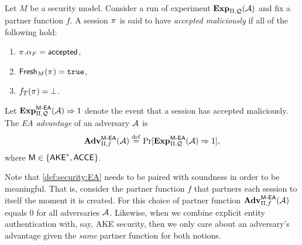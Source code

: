 \begin{definition}\label{def:security:EA}
Let $M$ be a security model.
Consider a run of experiment $\mathbf{Exp}_{\mathrm{\Pi},\mathcal{Q}}^{}(\mathcal{A})$ and fix a partner function $f$. 
A session $\oracle$ is said to have \emph{accepted maliciously} if all of the following hold:
\begin{enumerate}
	\item $\oracle.\runstate_F = \accepted$,
	
	\item $\fresh_{M}(\oracle) = \TRUE$,
	
	\item $f_T(\oracle) = \bot$.
\end{enumerate}
Let $\mathbf{Exp}_{\mathrm{\Pi},\mathcal{Q}}^{\operatorname{\mathsf{M-EA}}}(\mathcal{A}) \Rightarrow 1$ denote the event that a session has accepted maliciously. 
The \emph{EA advantage} of an adversary $\mathcal{A}$ is
\begin{equation}
\mathbf{Adv}_{\mathrm{\Pi},f}^{\operatorname{\mathsf{M-EA}}}(\mathcal{A}) \overset{\mathrm{def}}{=} \Pr[\mathbf{Exp}_{\mathrm{\Pi},\mathcal{Q}}^{\operatorname{\mathsf{M-EA}}}(\mathcal{A}) \Rightarrow 1] ,
\end{equation} 
where $\mathsf{M} \in \lbrace \mathsf{AKE}^*, \mathsf{ACCE} \rbrace$.
\end{definition}

Note that \cref{def:security:EA} needs to be paired with soundness in order to be meaningful.
That is, consider the partner function $f$ that partners each session to itself the moment it is created.
For this choice of partner function  $\mathbf{Adv}_{\mathrm{\Pi},f}^{\operatorname{\mathsf{M-EA}}}(\mathcal{A})$ equals $0$ for all adversaries $\mathcal{A}$.
Likewise,
when we combine explicit entity authentication with,
say,
AKE security,
then we only care about an adversary's advantage given the \emph{same} partner function for both notions.


